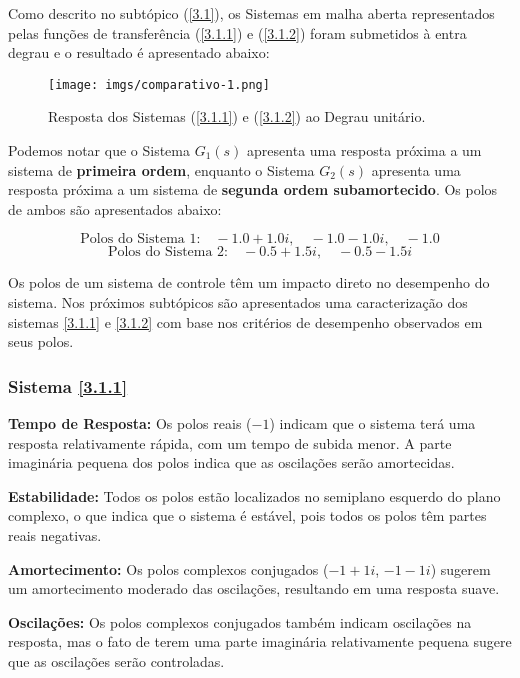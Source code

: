 \documentclass[a4paper,12pt]{article}
\begin{document}
Como descrito no subtópico (\ref{3.1}), os Sistemas em malha aberta representados pelas funções de transferência (\ref{3.1.1}) e (\ref{3.1.2}) foram submetidos à entra degrau e o resultado é apresentado abaixo:

\begin{figure}[h!]\label{fig2}
  \centering
  \texttt{[image: imgs/comparativo-1.png]}
  \caption{Resposta dos Sistemas (\ref{3.1.1}) e (\ref{3.1.2}) ao Degrau unitário.}
\end{figure}

Podemos notar que o Sistema $G_1(s)$ apresenta uma resposta próxima a um sistema de \textbf{primeira ordem}, enquanto o Sistema $G_2(s)$ apresenta uma resposta próxima a um sistema de \textbf{segunda ordem subamortecido}. Os polos de ambos são apresentados abaixo:

\begin{equation*}
\text{Polos do Sistema 1:} \quad -1.0 + 1.0i, \quad -1.0 - 1.0i, \quad -1.0
\end{equation*}
\begin{equation*}
\text{Polos do Sistema 2:} \quad -0.5 + 1.5i, \quad -0.5 - 1.5i
\end{equation*}

Os polos de um sistema de controle têm um impacto direto no desempenho do sistema. Nos próximos subtópicos são apresentados uma caracterização dos sistemas \ref{3.1.1} e \ref{3.1.2} com base nos critérios de desempenho observados em seus polos.

\subsubsection{Sistema \ref{3.1.1}}\label{4.4.1.1}

\textbf{Tempo de Resposta:} Os polos reais ($-1$) indicam que o sistema terá uma resposta relativamente rápida, com um tempo de subida menor. A parte imaginária pequena dos polos indica que as oscilações serão amortecidas.

\textbf{Estabilidade:} Todos os polos estão localizados no semiplano esquerdo do plano complexo, o que indica que o sistema é estável, pois todos os polos têm partes reais negativas.

\textbf{Amortecimento:} Os polos complexos conjugados ($-1 + 1i$, $-1 - 1i$) sugerem um amortecimento moderado das oscilações, resultando em uma resposta suave.

\textbf{Oscilações:} Os polos complexos conjugados também indicam oscilações na resposta, mas o fato de terem uma parte imaginária relativamente pequena sugere que as oscilações serão controladas.
\end{document}
